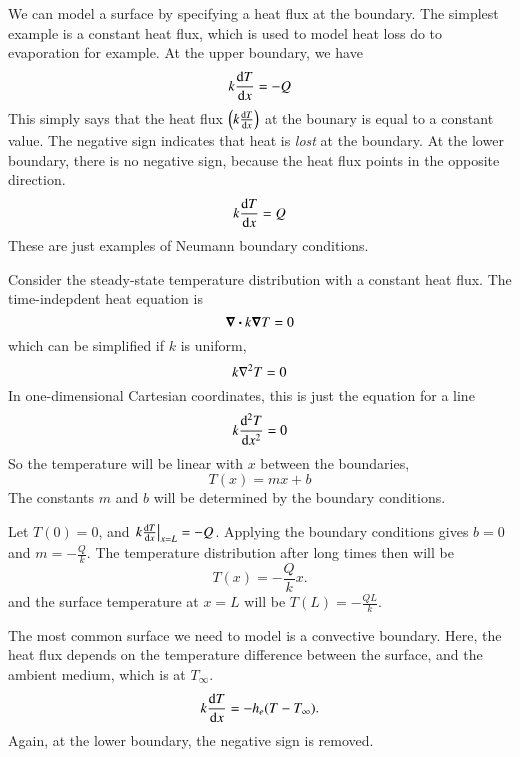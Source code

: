 \documentclass[letterpaper,12pt]{article}
\begin{document}
We can model a surface by specifying a heat flux at the boundary. The simplest example is a constant heat flux, which is used to model heat loss do
to evaporation for example. At the upper boundary, we have
\begin{equation}
  k \dv{T}{x} = -Q
\end{equation}
This simply says that the heat flux $\qty(k \dv{T}{x})$ at the bounary is equal to a constant value. The negative sign indicates that heat is \emph{lost} at the boundary.
At the lower boundary, there is no negative sign, because the heat flux points in the opposite direction.
\begin{equation}
  k \dv{T}{x} = Q
\end{equation}
These are just examples of Neumann boundary conditions.

Consider the steady-state temperature distribution with a constant heat flux. The time-indepdent heat equation is
\begin{equation}
  \label{eq:steady_heat_eq}
  \div{ k \grad {T} } = 0
\end{equation}
which can be simplified if $k$ is uniform,
\begin{equation}
  \label{eq:steady_heat_eq_simp}
  k \laplacian T = 0
\end{equation}
In one-dimensional Cartesian coordinates, this is just the equation for a line
\begin{equation}
  \label{eq:steady_heat_eq_1d_cart}
  k \dv[2]{T}{x} = 0
\end{equation}
So the temperature will be linear with $x$ between the boundaries,
\begin{equation}
  T(x) = m x + b
\end{equation}
The constants $m$ and $b$ will be determined by the boundary conditions.

Let $T(0) = 0$, and $\left.k\dv{T}{x} \right|_{x = L} = -Q$. Applying the boundary conditions gives $b = 0$ and $m = -\frac{Q}{k}$. The temperature
distribution after long times then will be
\begin{equation}
  T(x) = -\frac{Q}{k} x.
\end{equation}
and the surface temperature at $x = L$ will be $T(L) = -\frac{QL}{k}$.

The most common surface we need to model is a convective boundary. Here, the heat flux depends on the temperature difference
between the surface, and the ambient medium, which is at $T_\infty$.
\begin{equation}
  \label{eq:conv_bc}
  k \dv{T}{x} = -h_e(T - T_\infty).
\end{equation}
Again, at the lower boundary, the negative sign is removed.
\end{document}

